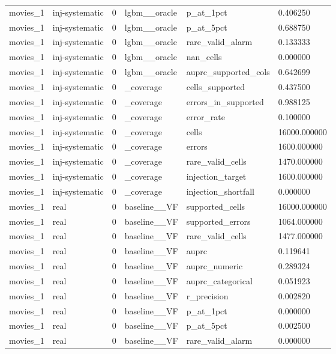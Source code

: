 \begin{tabular}{llllll}
movies\_1 & inj-systematic & 0 & lgbm\_\_oracle & p\_at\_1pct & 0.406250 \\
movies\_1 & inj-systematic & 0 & lgbm\_\_oracle & p\_at\_5pct & 0.688750 \\
movies\_1 & inj-systematic & 0 & lgbm\_\_oracle & rare\_valid\_alarm & 0.133333 \\
movies\_1 & inj-systematic & 0 & lgbm\_\_oracle & nan\_cells & 0.000000 \\
movies\_1 & inj-systematic & 0 & lgbm\_\_oracle & auprc\_supported\_cols & 0.642699 \\
movies\_1 & inj-systematic & 0 & \_coverage & cells\_supported & 0.437500 \\
movies\_1 & inj-systematic & 0 & \_coverage & errors\_in\_supported & 0.988125 \\
movies\_1 & inj-systematic & 0 & \_coverage & error\_rate & 0.100000 \\
movies\_1 & inj-systematic & 0 & \_coverage & cells & 16000.000000 \\
movies\_1 & inj-systematic & 0 & \_coverage & errors & 1600.000000 \\
movies\_1 & inj-systematic & 0 & \_coverage & rare\_valid\_cells & 1470.000000 \\
movies\_1 & inj-systematic & 0 & \_coverage & injection\_target & 1600.000000 \\
movies\_1 & inj-systematic & 0 & \_coverage & injection\_shortfall & 0.000000 \\
movies\_1 & real & 0 & baseline\_\_VF & supported\_cells & 16000.000000 \\
movies\_1 & real & 0 & baseline\_\_VF & supported\_errors & 1064.000000 \\
movies\_1 & real & 0 & baseline\_\_VF & rare\_valid\_cells & 1477.000000 \\
movies\_1 & real & 0 & baseline\_\_VF & auprc & 0.119641 \\
movies\_1 & real & 0 & baseline\_\_VF & auprc\_numeric & 0.289324 \\
movies\_1 & real & 0 & baseline\_\_VF & auprc\_categorical & 0.051923 \\
movies\_1 & real & 0 & baseline\_\_VF & r\_precision & 0.002820 \\
movies\_1 & real & 0 & baseline\_\_VF & p\_at\_1pct & 0.000000 \\
movies\_1 & real & 0 & baseline\_\_VF & p\_at\_5pct & 0.002500 \\
movies\_1 & real & 0 & baseline\_\_VF & rare\_valid\_alarm & 0.000000 \\

\end{tabular}

